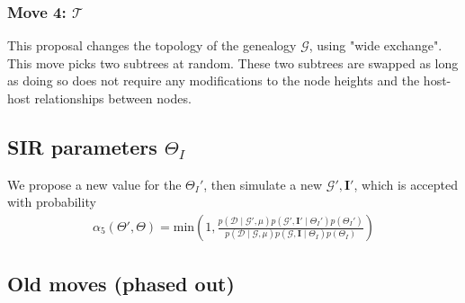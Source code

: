 \documentclass[a4paper,18pt]{report}
\begin{document}
\subsubsection{Move 4: $\mathcal{T}$}
This proposal changes the topology of the genealogy $\mathcal{G}$, using "wide exchange". This move picks two subtrees at random. These two subtrees are swapped as long as doing so does not require any modifications to the node heights and the host-host relationships between nodes. 
\subsection{SIR parameters $\Theta_{I}$}
We propose a new value for the $\Theta_{I}'$, then simulate a new $\mathcal{G}', \mathbf{I}'$,  which is accepted with probability 
\begin{eqnarray}
\alpha_{5}(\Theta',\Theta)=\textrm{min}\left(1,\frac{p(\mathcal{D}\mid \mathcal{G}', \mu) p(\mathcal{G}', \mathbf{I}' \mid \Theta_{I}')p(\Theta_{I}')}{p(\mathcal{D}\mid \mathcal{G}, \mu ) p(\mathcal{G}, \mathbf{I} \mid \Theta_{I})p(\Theta_I)} \right)
\end{eqnarray}


\subsection{Old moves (phased out)}
\end{document}

